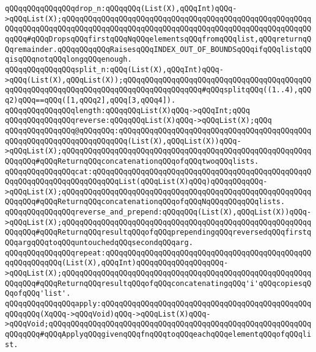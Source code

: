 \verb|qQQqqQQqqQQqqQQqdrop_n:qQQqqQQq(List(X),qQQqInt)qQQq->qQQqList(X);qQQqqQQqqQQqqQQqqQQqqQQqqQQqqQQqqQQqqQQqqQQqqQQqqQQqqQQqqQQqqQQqqQQqqQQqqQQqqQQqqQQqqQQqqQQqqQQqqQQqqQQqqQQqqQQqqQQqqQQqqQQqqQQqqQQq#qQQqDropsqQQqfirstqQQqNqQQqelementsqQQqfromqQQqlist,qQQqreturnqQQqremainder.qQQqqQQqqQQqRaisesqQQqINDEX_OUT_OF_BOUNDSqQQqifqQQqlistqQQqisqQQqnotqQQqlongqQQqenough.|\newline
\verb|qQQqqQQqqQQqqQQqsplit_n:qQQq(List(X),qQQqInt)qQQq->qQQq(List(X),qQQqList(X));qQQqqQQqqQQqqQQqqQQqqQQqqQQqqQQqqQQqqQQqqQQqqQQqqQQqqQQqqQQqqQQqqQQqqQQqqQQqqQQqqQQqqQQq#qQQqsplitqQQq((1..4),qQQq2)qQQq==qQQq([1,qQQq2],qQQq[3,qQQq4]).|\newline
\newline
\verb|qQQqqQQqqQQqqQQqlength:qQQqqQQqList(X)qQQq->qQQqInt;qQQq|\newline
\newline
\verb|qQQqqQQqqQQqqQQqreverse:qQQqqQQqList(X)qQQq->qQQqList(X);qQQq|\newline
\newline
\verb|qQQqqQQqqQQqqQQq@qQQqqQQq:qQQqqQQqqQQqqQQqqQQqqQQqqQQqqQQqqQQqqQQqqQQqqQQqqQQqqQQqqQQqqQQqqQQqqQQq(List(X),qQQqList(X))qQQq->qQQqList(X);qQQqqQQqqQQqqQQqqQQqqQQqqQQqqQQqqQQqqQQqqQQqqQQqqQQqqQQqqQQqqQQq#qQQqReturnqQQqconcatenationqQQqofqQQqtwoqQQqlists.|\newline
\verb|qQQqqQQqqQQqqQQqcat:qQQqqQQqqQQqqQQqqQQqqQQqqQQqqQQqqQQqqQQqqQQqqQQqqQQqqQQqqQQqqQQqqQQqqQQqqQQqList(qQQqList(X)qQQq)qQQqqQQqqQQq->qQQqList(X);qQQqqQQqqQQqqQQqqQQqqQQqqQQqqQQqqQQqqQQqqQQqqQQqqQQqqQQqqQQqqQQq#qQQqReturnqQQqconcatenationqQQqofqQQqNqQQqqQQqqQQqlists.|\newline
\verb|qQQqqQQqqQQqqQQqreverse_and_prepend:qQQqqQQq(List(X),qQQqList(X))qQQq->qQQqList(X);qQQqqQQqqQQqqQQqqQQqqQQqqQQqqQQqqQQqqQQqqQQqqQQqqQQqqQQqqQQqqQQq#qQQqReturnqQQqresultqQQqofqQQqprependingqQQqreversedqQQqfirstqQQqargqQQqtoqQQquntouchedqQQqsecondqQQqarg.|\newline
\verb|qQQqqQQqqQQqqQQqrepeat:qQQqqQQqqQQqqQQqqQQqqQQqqQQqqQQqqQQqqQQqqQQqqQQqqQQqqQQqqQQq(List(X),qQQqInt)qQQqqQQqqQQqqQQqqQQq->qQQqList(X);qQQqqQQqqQQqqQQqqQQqqQQqqQQqqQQqqQQqqQQqqQQqqQQqqQQqqQQqqQQqqQQq#qQQqReturnqQQqresultqQQqofqQQqconcatenatingqQQq'i'qQQqcopiesqQQqofqQQq'list'.|\newline
\newline
\verb|qQQqqQQqqQQqqQQqapply:qQQqqQQqqQQqqQQqqQQqqQQqqQQqqQQqqQQqqQQqqQQqqQQqqQQqqQQq(XqQQq->qQQqVoid)qQQq->qQQqList(X)qQQq->qQQqVoid;qQQqqQQqqQQqqQQqqQQqqQQqqQQqqQQqqQQqqQQqqQQqqQQqqQQqqQQqqQQqqQQqqQQq#qQQqApplyqQQqgivenqQQqfnqQQqtoqQQqeachqQQqelementqQQqofqQQqlist.|\newline

